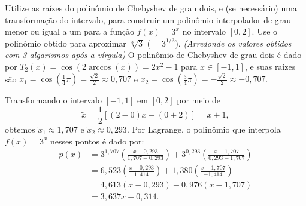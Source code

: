 \documentclass[12pt,a4paper]{article}
\begin{document}
\begin{ExerciseList}
\Exercise[title={2,5}]
Utilize as raízes do polinômio de Chebyshev de grau dois, e (se necessário) uma transformação do intervalo, para construir um polinômio interpolador de grau menor ou igual a um para a função $f(x) = 3^x$ no intervalo $[0, 2]$. Use o polinômio obtido para aproximar $\sqrt[3]{3}$ ($=3^{1/3}$).
{\color{blue} \textit{(Arredonde os valores obtidos com 3 algarismos após a vírgula)}}
\Answer
O polinômio de Chebyshev de grau dois é dado por $T_2(x) = \cos(2\arccos(x)) = 2 x^2 - 1$ para $x \in [-1, 1]$, e suas raízes são $x_1 = \cos\left(\frac{1}{4}\pi\right) = \frac{\sqrt{2}}{2} \approx 0,707$ e $x_2 = \cos\left(\frac{3}{4}\pi\right) = -\frac{\sqrt{2}}{2} \approx -0,707$.

\begin{minipage}{0.75\textwidth}
Transformando o intervalo $[-1, 1]$ em $[0, 2]$ por meio de
\[
\tilde{x} = \frac{1}{2}[(2 - 0) x + (0 + 2)] = x + 1,
\]
obtemos $\tilde{x}_1 \approx 1,707$ e $\tilde{x}_2 \approx 0,293$. Por Lagrange, o polinômio que interpola $f(x) = 3^x$ nesses pontos é dado por:
\begin{align*}
    p(x)
    & = 3^{1,707} \left(\frac{x - 0,293}{1,707 - 0,293}\right)
    + 3^{0,293} \left(\frac{x - 1,707}{0,293 - 1,707}\right)\\
    & = 6,523 \left(\frac{x - 0,293}{1,414}\right)
    + 1,380 \left(\frac{x - 1,707}{-1,414}\right)\\
    & = 4,613(x - 0,293) - 0,976 (x - 1,707) \\
    & = 3,637x + 0,314.
\end{align*}


\end{minipage}
\end{ExerciseList}
\end{document}
